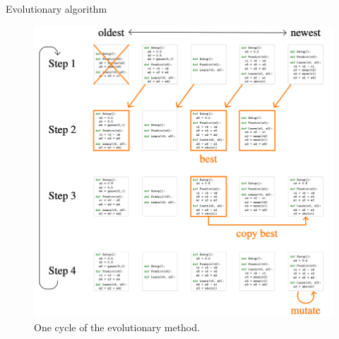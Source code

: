\documentclass{beamer}
\begin{document}
\begin{frame}{Evolutionary algorithm}
 
    \begin{figure}
        \centering
        \includegraphics[scale=0.24]{evolution.png}
        \caption{One cycle of the evolutionary method.}
        \label{fig:evol}
    \end{figure}
    
\end{frame}
\end{document}
